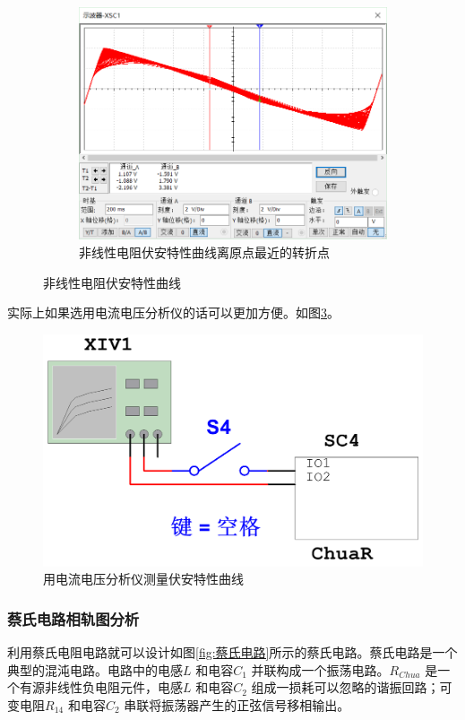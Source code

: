 \documentclass{article}
\begin{document}
\begin{figure}[htbp]
\begin{subfigure}[htbp]{.30\linewidth}
		\centering
		\includegraphics[width=\linewidth]{ChuaVA3.png}
		\caption{非线性电阻伏安特性曲线离原点最近的转折点}
		\label{fig:非线性电阻伏安特性曲线极值点离原点最近的转折点}
	\end{subfigure}
	\caption{非线性电阻伏安特性曲线}
	\label{fig:非线性电阻伏安特性曲线}
\end{figure}

\newpage

实际上如果选用电流电压分析仪的话可以更加方便。如图\ref{fig:用电流电压分析仪测量伏安特性曲线}。

\begin{figure}[htpb]
	\centering
	\includegraphics[width=.4\linewidth]{ChuaR4.png}
	\caption{用电流电压分析仪测量伏安特性曲线}
	\label{fig:用电流电压分析仪测量伏安特性曲线}
\end{figure}

\subsubsection{蔡氏电路相轨图分析}%
\label{ssub:蔡氏电路相轨图分析}

利用蔡氏电阻电路就可以设计如图\ref{fig:蔡氏电路}所示的蔡氏电路。蔡氏电路是一个典型的混沌电路。电路中的电感\( L \) 和电容\( C_1 \) 并联构成一个振荡电路。\( R_{Chua} \) 是一个有源非线性负电阻元件，电感\( L \) 和电容\( C_2 \) 组成一损耗可以忽略的谐振回路；可变电阻\( R_{14} \) 和电容\( C_2 \) 串联将振荡器产生的正弦信号移相输出。
\end{document}
